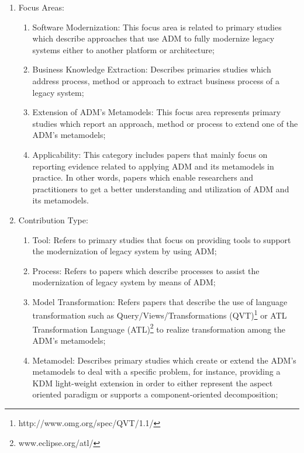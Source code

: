\begin{enumerate}

\item Focus Areas: 

\begin{enumerate}

\item Software Modernization: This focus area is related to primary studies which describe approaches that use ADM to fully modernize legacy systems either to another platform  or architecture;

\item Business Knowledge Extraction: Describes primaries studies which address process, method or approach to extract business process of a legacy system;

\item Extension of ADM's Metamodels: This focus area represents primary studies which report an approach, method or process to extend one of the ADM's metamodels;

\item Applicability: This category includes papers that mainly focus on reporting evidence related to applying ADM and its metamodels in practice. In other words, papers which enable researchers and practitioners to get a better understanding and utilization of ADM and its metamodels.

\end{enumerate}

\item Contribution Type:

\begin{enumerate}

\item Tool: Refers to primary studies that focus on providing tools to support the modernization of legacy system by using ADM; 

\item Process: Refers to papers which describe processes to assist the modernization of legacy system by means of ADM;

\item Model Transformation: Refers papers that describe the use of language transformation such as Query/Views/Transformations (QVT)\footnote{http://www.omg.org/spec/QVT/1.1/} or ATL Transformation Language (ATL)\footnote{www.eclipse.org/atl/} to realize transformation among the ADM's metamodels;

\item Metamodel: Describes primary studies which create or extend the ADM's metamodels to deal with a specific problem, for instance, providing a KDM light-weight extension in order to either represent the aspect oriented paradigm or supports a component-oriented decomposition;


\end{enumerate}
\end{enumerate}
